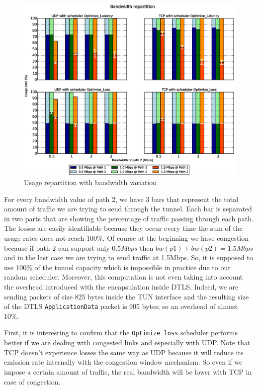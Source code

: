 \begin{figure}[!ht]
\centering
\includegraphics[width=\textwidth]{images/xp/graph1.eps}
\caption{Usage repartition with bandwidth variation}
\label{fig:dynbw}
\end{figure}


For every bandwidth value of path 2, we have 3 bars that represent the total amount of traffic we are trying to send through the tunnel. Each bar is separated in two parts that are showing the percentage of traffic passing through each path. The losses are easily identifiable because they occur every time the sum of the usage rates does not reach 100\%. Of course at the beginning we have congestion because if path 2 can support only $0.5Mbps$ then $bw(p1) + bw(p2) = 1.5Mbps$ and in the last case we are trying to send traffic at 1.5Mbps. So, it is supposed to use 100\% of the tunnel capacity which is impossible in practice due to our random scheduler. Moreover, this computation is not even taking into account the overhead introduced with the encapsulation inside DTLS. Indeed, we are sending packets of size 825 bytes inside the TUN interface and the resulting size of the DTLS \texttt{ApplicationData} packet is 905 bytes; so an overhead of almost 10\%.

First, it is interesting to confirm that the \texttt{Optimize loss} scheduler performs better if we are dealing with congested links and especially with UDP. Note that TCP doesn't experience losses the same way as UDP because it will reduce its emission rate internally with the congestion window mechanism. So even if we impose a certain amount of traffic, the real bandwidth will be lower with TCP in case of congestion.

